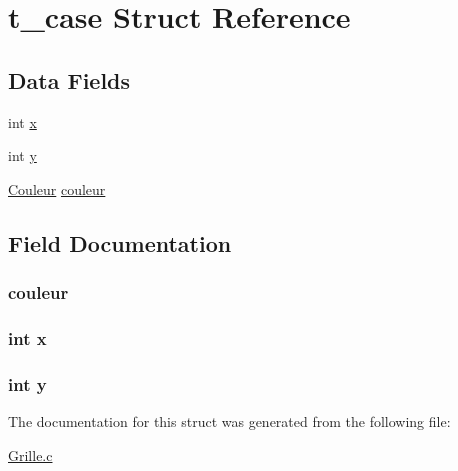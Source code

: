 \hypertarget{structt__case}{}\section{t\+\_\+case Struct Reference}
\label{structt__case}
\subsection*{Data Fields}
\begin{DoxyCompactItemize}
\item 
int \hyperlink{structt__case_a6150e0515f7202e2fb518f7206ed97dc}{x}
\item 
int \hyperlink{structt__case_a0a2f84ed7838f07779ae24c5a9086d33}{y}
\item 
\hyperlink{_grille_8c_aa304d0ca681f782b1d7735da33037dd7}{Couleur} \hyperlink{structt__case_af0e152d09c13944935e00bef7a3c5111}{couleur}
\end{DoxyCompactItemize}


\subsection{Field Documentation}
\subsubsection[{\texorpdfstring{couleur}{couleur}}]{ couleur}\hypertarget{structt__case_af0e152d09c13944935e00bef7a3c5111}{}\label{structt__case_af0e152d09c13944935e00bef7a3c5111}
\subsubsection[{\texorpdfstring{x}{x}}]{\setlength{\rightskip}{0pt plus 5cm}int x}\hypertarget{structt__case_a6150e0515f7202e2fb518f7206ed97dc}{}\label{structt__case_a6150e0515f7202e2fb518f7206ed97dc}
\subsubsection[{\texorpdfstring{y}{y}}]{\setlength{\rightskip}{0pt plus 5cm}int y}\hypertarget{structt__case_a0a2f84ed7838f07779ae24c5a9086d33}{}\label{structt__case_a0a2f84ed7838f07779ae24c5a9086d33}


The documentation for this struct was generated from the following file\+:\begin{DoxyCompactItemize}
\item 
\hyperlink{_grille_8c}{Grille.\+c}\end{DoxyCompactItemize}
